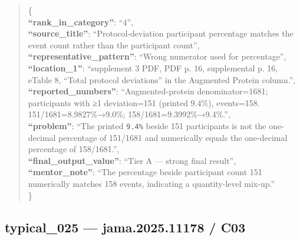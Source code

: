\documentclass[
  letterpaper,
  9pt]{extreport}
\begin{document}
\begin{quote}
\{\\
\textbf{``rank\_in\_category''}: ``4'',\\
\textbf{``source\_title''}: ``Protocol-deviation participant percentage
matches the event count rather than the participant count'',\\
\textbf{``representative\_pattern''}: ``Wrong numerator used for
percentage'',\\
\textbf{``location\_1''}: ``supplement 3 PDF, PDF p. 16, supplemental p.
16, eTable 8, ``Total protocol deviations'' in the Augmented Protein
column.'',\\
\textbf{``reported\_numbers''}: ``Augmented-protein denominator=1681;
participants with ≥1 deviation=151 (printed 9.4\%), events=158.
151/1681=8.9827\%→9.0\%; 158/1681=9.3992\%→9.4\%.'',\\
\textbf{``problem''}: ``The printed \texttt{9.4\%} beside 151
participants is not the one-decimal percentage of 151/1681 and
numerically equals the one-decimal percentage of 158/1681.'',\\
\textbf{``final\_output\_value''}: ``Tier A --- strong final result'',\\
\textbf{``mentor\_note''}: ``The percentage beside participant count 151
numerically matches 158 events, indicating a quantity-level mix-up.''\\
\}
\end{quote}

\hypertarget{typical_025--jama202511178--c03}{%
\subsection{typical\_025 --- jama.2025.11178 /
C03}\label{typical_025--jama202511178--c03}}
\end{document}
